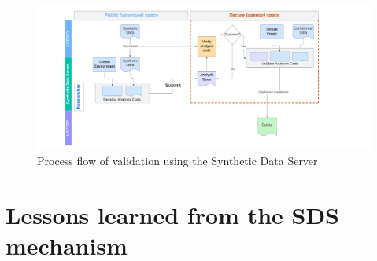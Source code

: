 \documentclass[]{hdsr}
\begin{document}
\begin{figure}
    \centering
    \includegraphics[width=\textwidth]{figs/SSB Flow.png}
    \caption{Process flow of validation using the Synthetic Data Server}
    \label{fig:ssb-flow}
\end{figure}




\section{Lessons learned from the SDS mechanism}
\end{document}
